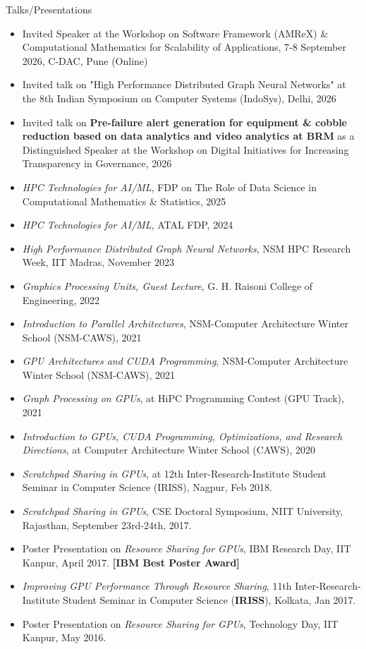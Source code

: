 \documentclass{resume} %
\begin{document}
\begin{rSection}{Talks/Presentations}
\begin{itemize}
\item Invited Speaker at the Workshop on Software Framework (AMReX) \& Computational Mathematics for Scalability of Applications, 7-8 September 2026, C-DAC, Pune (Online)
\item Invited talk on "High Performance Distributed Graph Neural Networks" at the 8th Indian Symposium on Computer Systems (IndoSys), Delhi, 2026
\item Invited talk on \textbf{Pre-failure alert generation for equipment \& cobble reduction based on data analytics and video analytics at BRM} as a Distinguished Speaker at the Workshop on Digital Initiatives for Increasing Transparency in Governance, 2026
\item \textit{HPC Technologies for AI/ML}, FDP on The Role of Data Science in Computational Mathematics \& Statistics, 2025
\item \textit{HPC Technologies for AI/ML}, ATAL FDP, 2024
\item \textit{High Performance Distributed Graph Neural Networks}, NSM HPC Research Week, IIT Madras, November 2023
\item \textit{Graphics Processing Units, Guest Lecture}, G. H. Raisoni College of Engineering, 2022
\item \textit{Introduction to Parallel Architectures}, NSM-Computer Architecture Winter School (NSM-CAWS), 2021
\item \textit{GPU Architectures and CUDA Programming}, NSM-Computer Architecture Winter School (NSM-CAWS), 2021	
\item \textit{Graph Processing on GPUs}, at HiPC Programming Contest (GPU Track), 2021
\item \textit{Introduction to GPUs, CUDA Programming, Optimizations, and Research Directions}, at Computer Architecture Winter School (CAWS), 2020
\item \textit{Scratchpad Sharing in GPUs}, at 12th Inter-Research-Institute Student Seminar in Computer Science (IRISS), Nagpur, Feb 2018. 
\item \textit{Scratchpad Sharing in GPUs}, CSE Doctoral Symposium, NIIT University, Rajasthan, September 23rd-24th, 2017.
\item Poster Presentation on \textit{Resource Sharing for GPUs}, IBM Research Day, IIT Kanpur, April 2017. \textbf{[IBM Best Poster Award]} 
\item \textit{Improving GPU Performance Through Resource Sharing}, 11th Inter-Research-Institute Student Seminar in Computer Science (\textbf{IRISS}), Kolkata, Jan 2017.
\item Poster Presentation on \textit{Resource Sharing for GPUs}, Technology Day, IIT Kanpur, May 2016. 

\end{itemize}
\end{rSection}
\end{document}
